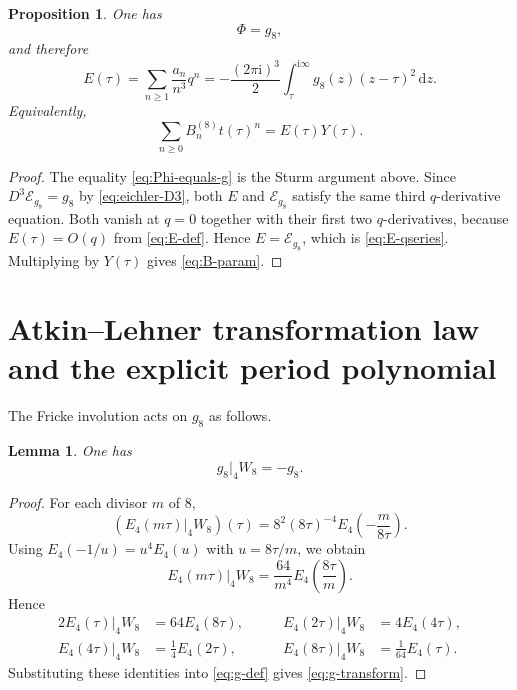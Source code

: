 \documentclass[11pt]{amsart}
\numberwithin{equation}{section}
\theoremstyle{plain}
\newtheorem{proposition}[theorem]{Proposition}
\newtheorem{lemma}[theorem]{Lemma}
\theoremstyle{definition}
\theoremstyle{remark}
\newcommand{\dd}{\mathrm{d}}
\newcommand{\ii}{\mathrm{i}}
\newcommand{\Efour}{E_4}
\newcommand{\Dop}{D}
\begin{document}
\begin{proposition}\label{prop:E-eichler}
One has
\begin{equation}\label{eq:Phi-equals-g}
\Phi=g_8,
\end{equation}
and therefore
\begin{equation}\label{eq:E-qseries}
E(\tau)=\sum_{n\ge 1}\frac{a_n}{n^3}q^n
=-\frac{(2\pi\ii)^3}{2}\int_{\tau}^{\ii\infty}g_8(z)(z-\tau)^2\,\dd z.
\end{equation}
Equivalently,
\begin{equation}\label{eq:B-param}
\sum_{n\ge 0}B_n^{(8)}t(\tau)^n=E(\tau)Y(\tau).
\end{equation}
\end{proposition}

\begin{proof}
The equality \eqref{eq:Phi-equals-g} is the Sturm argument above. Since $\Dop^3\mathcal E_{g_8}=g_8$ by \eqref{eq:eichler-D3}, both $E$ and $\mathcal E_{g_8}$ satisfy the same third $q$-derivative equation. Both vanish at $q=0$ together with their first two $q$-derivatives, because $E(\tau)=O(q)$ from \eqref{eq:E-def}. Hence $E=\mathcal E_{g_8}$, which is \eqref{eq:E-qseries}. Multiplying by $Y(\tau)$ gives \eqref{eq:B-param}.
\end{proof}

\section{Atkin--Lehner transformation law and the explicit period polynomial}\label{sec:period}

The Fricke involution acts on $g_8$ as follows.

\begin{lemma}\label{lem:g-transform}
One has
\begin{equation}\label{eq:g-transform}
g_8|_4W_8=-g_8.
\end{equation}
\end{lemma}

\begin{proof}
For each divisor $m$ of $8$,
\[
(\Efour(m\tau)|_4W_8)(\tau)=8^2(8\tau)^{-4}\Efour\!\left(-\frac{m}{8\tau}\right).
\]
Using $\Efour(-1/u)=u^4\Efour(u)$ with $u=8\tau/m$, we obtain
\[
\Efour(m\tau)|_4W_8=\frac{64}{m^4}\Efour\!\left(\frac{8\tau}{m}\right).
\]
Hence
\begin{alignat*}{2}
\Efour(\tau)|_4W_8&=64\Efour(8\tau),
&\qquad
\Efour(2\tau)|_4W_8&=4\Efour(4\tau),\\
\Efour(4\tau)|_4W_8&=\tfrac14\Efour(2\tau),
&\qquad
\Efour(8\tau)|_4W_8&=\tfrac1{64}\Efour(\tau).
\end{alignat*}
Substituting these identities into \eqref{eq:g-def} gives \eqref{eq:g-transform}.
\end{proof}
\end{document}
